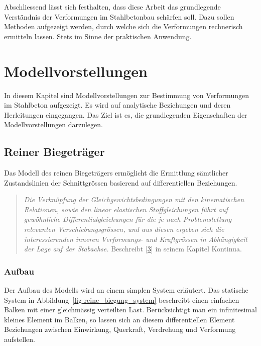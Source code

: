 \documentclass[
  12pt,
  letterpaper,
  egregdoesnotlikesansseriftitles]{scrreprt}
\begin{document}
Abschliessend lässt sich festhalten, dass diese Arbeit das grundlegende
Verständnis der Verformungen im Stahlbetonbau schärfen soll. Dazu sollen
Methoden aufgezeigt werden, durch welche sich die Verformungen
rechnerisch ermitteln lassen. Stets im Sinne der praktischen Anwendung.


\hypertarget{sec-modellbeschrieb}{%
\chapter{Modellvorstellungen}\label{sec-modellbeschrieb}}

In diesem Kapitel sind Modellvorstellungen zur Bestimmung von
Verformungen im Stahlbeton aufgezeigt. Es wird auf analytische
Beziehungen und deren Herleitungen eingegangen. Das Ziel ist es, die
grundlegenden Eigenschaften der Modellvorstellungen darzulegen.

\hypertarget{sec-kontinua}{%
\section{Reiner Biegeträger}\label{sec-kontinua}}

Das Modell des reinen Biegeträgers ermöglicht die Ermittlung sämtlicher
Zustandslinien der Schnittgrössen basierend auf differentiellen
Beziehungen.

\begin{quote}
\emph{Die Verknüpfung der Gleichgewichtsbedingungen mit den
kinematischen Relationen, sowie den linear elastischen Stoffgleichungen
führt auf gewöhnliche Differentialgleichungen für die je nach
Problemstellung relevanten Verschiebungsgrössen, und aus diesen ergeben
sich die interessierenden inneren Verformungs- und Kraftgrössen in
Abhängigkeit der Lage auf der Stabachse.} Beschreibt
{[}\protect\hyperlink{ref-Marti}{3}{]} in seinem Kapitel Kontinua.
\end{quote}

\hypertarget{aufbau}{%
\subsection{Aufbau}\label{aufbau}}

Der Aufbau des Modells wird an einem simplen System erläutert. Das
statische System in Abbildung~\ref{fig-reine_biegung_system} beschreibt
einen einfachen Balken mit einer gleichmässig verteilten Last.
Berücksichtigt man ein infinitesimal kleines Element im Balken, so
lassen sich an diesem differentiellen Element Beziehungen zwischen
Einwirkung, Querkraft, Verdrehung und Verformung aufstellen.
\end{document}
